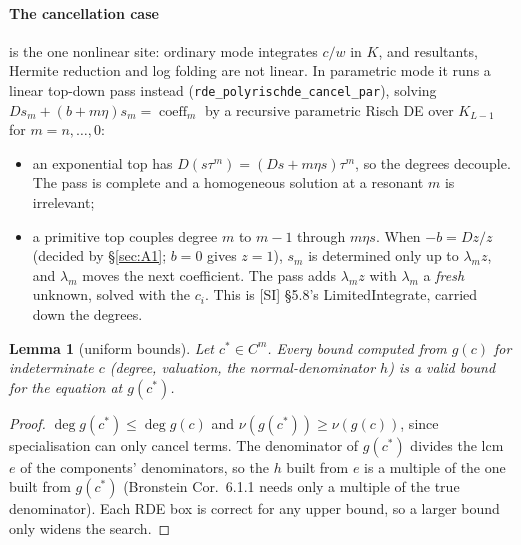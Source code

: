 \documentclass[11pt]{article}
\newtheorem{lemma}[theorem]{Lemma}
\theoremstyle{definition}
\theoremstyle{remark}
\newcommand{\code}[1]{\texttt{#1}}
\begin{document}
\paragraph{The cancellation case} is the one nonlinear site: ordinary mode integrates
$c/w$ in $K$, and resultants, Hermite reduction and log folding are not linear. In
parametric mode it runs a linear top-down pass instead (\code{rde\_polyrischde\_cancel\_par}),
solving $Ds_m+(b+m\eta)s_m=\operatorname{coeff}_m$ by a recursive parametric Risch DE
over $K_{L-1}$ for $m=n,\dots,0$:
\begin{itemize}
\item an exponential top has $D(s\tau^m)=(Ds+m\eta s)\tau^m$, so the degrees
  decouple. The pass is complete and a homogeneous solution at a resonant $m$ is
  irrelevant;
\item a primitive top couples degree $m$ to $m-1$ through $m\eta s$. When
  $-b=Dz/z$ (decided by \S\ref{sec:A1}; $b=0$ gives $z=1$), $s_m$ is determined only up
  to $\lambda_mz$, and $\lambda_m$ moves the next coefficient. The pass adds
  $\lambda_mz$ with $\lambda_m$ a \emph{fresh} unknown, solved with the $c_i$. This is
  [SI] \S5.8's LimitedIntegrate, carried down the degrees.
\end{itemize}

\begin{lemma}[uniform bounds]\label{lem:T11}
Let $c^*\in C^m$. Every bound computed from $g(c)$ for indeterminate $c$ (degree,
valuation, the normal-denominator $h$) is a valid bound for the equation at $g(c^*)$.
\end{lemma}
\begin{proof}
$\deg g(c^*)\le\deg g(c)$ and $\nu(g(c^*))\ge\nu(g(c))$, since specialisation can only
cancel terms. The denominator of $g(c^*)$ divides the lcm $e$ of the components'
denominators, so the $h$ built from $e$ is a multiple of the one built from $g(c^*)$
(Bronstein Cor.~6.1.1 needs only a multiple of the true denominator). Each RDE box is
correct for any upper bound, so a larger bound only widens the search.
\end{proof}
\end{document}
